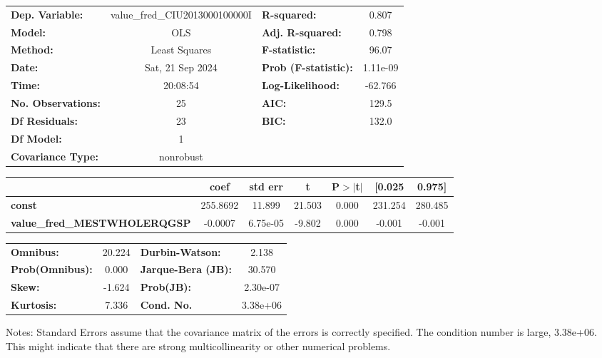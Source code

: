 \begin{center}
\begin{tabular}{lclc}
\toprule
\textbf{Dep. Variable:}              & value\_fred\_CIU2013000100000I & \textbf{  R-squared:         } &     0.807   \\
\textbf{Model:}                      &              OLS               & \textbf{  Adj. R-squared:    } &     0.798   \\
\textbf{Method:}                     &         Least Squares          & \textbf{  F-statistic:       } &     96.07   \\
\textbf{Date:}                       &        Sat, 21 Sep 2024        & \textbf{  Prob (F-statistic):} &  1.11e-09   \\
\textbf{Time:}                       &            20:08:54            & \textbf{  Log-Likelihood:    } &   -62.766   \\
\textbf{No. Observations:}           &                 25             & \textbf{  AIC:               } &     129.5   \\
\textbf{Df Residuals:}               &                 23             & \textbf{  BIC:               } &     132.0   \\
\textbf{Df Model:}                   &                  1             & \textbf{                     } &             \\
\textbf{Covariance Type:}            &           nonrobust            & \textbf{                     } &             \\
\bottomrule
\end{tabular}
\begin{tabular}{lcccccc}
                                     & \textbf{coef} & \textbf{std err} & \textbf{t} & \textbf{P$> |$t$|$} & \textbf{[0.025} & \textbf{0.975]}  \\
\midrule
\textbf{const}                       &     255.8692  &       11.899     &    21.503  &         0.000        &      231.254    &      280.485     \\
\textbf{value\_fred\_MESTWHOLERQGSP} &      -0.0007  &     6.75e-05     &    -9.802  &         0.000        &       -0.001    &       -0.001     \\
\bottomrule
\end{tabular}
\begin{tabular}{lclc}
\textbf{Omnibus:}       & 20.224 & \textbf{  Durbin-Watson:     } &    2.138  \\
\textbf{Prob(Omnibus):} &  0.000 & \textbf{  Jarque-Bera (JB):  } &   30.570  \\
\textbf{Skew:}          & -1.624 & \textbf{  Prob(JB):          } & 2.30e-07  \\
\textbf{Kurtosis:}      &  7.336 & \textbf{  Cond. No.          } & 3.38e+06  \\
\bottomrule
\end{tabular}
\end{center}

Notes: \newline
 [1] Standard Errors assume that the covariance matrix of the errors is correctly specified. \newline
 [2] The condition number is large, 3.38e+06. This might indicate that there are \newline
 strong multicollinearity or other numerical problems.